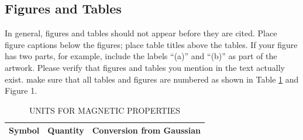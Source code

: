 \documentclass[12pt,a4paper]{article}
\begin{document}







\subsection{Figures and Tables}
In general, figures and tables should not appear before they are cited.  Place figure captions below the figures; place table titles above the tables.  If your figure has two parts, for example, include the labels ``(a)'' and ``(b)'' as part of the artwork.  Please verify that figures and tables you mention in the text actually exist.  make sure that all tables and figures are numbered as shown in Table \ref{units} and Figure 1.

\begin{table}[htb]
\centering
\caption{UNITS FOR MAGNETIC PROPERTIES}
\vspace*{6pt}
\label{units}
\begin{tabular}{ccc}\hline\hline
Symbol & Quantity & Conversion from Gaussian \\ \hline
\end{tabular}
\end{table}

\end{document}
